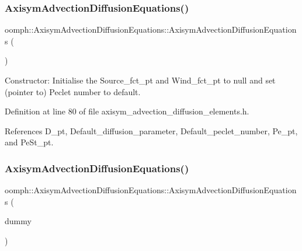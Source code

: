 \subsubsection{\texorpdfstring{Axisym\+Advection\+Diffusion\+Equations()}{AxisymAdvectionDiffusionEquations()}\hspace{0.1cm}{\footnotesize\ttfamily [1/2]}}
{\footnotesize\ttfamily oomph\+::\+Axisym\+Advection\+Diffusion\+Equations\+::\+Axisym\+Advection\+Diffusion\+Equations (\begin{DoxyParamCaption}{ }\end{DoxyParamCaption})\hspace{0.3cm}{\ttfamily [inline]}}



Constructor\+: Initialise the Source\+\_\+fct\+\_\+pt and Wind\+\_\+fct\+\_\+pt to null and set (pointer to) Peclet number to default. 



Definition at line 80 of file axisym\+\_\+advection\+\_\+diffusion\+\_\+elements.\+h.



References D\+\_\+pt, Default\+\_\+diffusion\+\_\+parameter, Default\+\_\+peclet\+\_\+number, Pe\+\_\+pt, and Pe\+St\+\_\+pt.

\mbox{\label{classoomph_1_1AxisymAdvectionDiffusionEquations_a6932ab2bbb743d14a97d26fd9f0000d4}} 
\subsubsection{\texorpdfstring{Axisym\+Advection\+Diffusion\+Equations()}{AxisymAdvectionDiffusionEquations()}\hspace{0.1cm}{\footnotesize\ttfamily [2/2]}}
{\footnotesize\ttfamily oomph\+::\+Axisym\+Advection\+Diffusion\+Equations\+::\+Axisym\+Advection\+Diffusion\+Equations (\begin{DoxyParamCaption}\item[{const \hyperlink{classoomph_1_1AxisymAdvectionDiffusionEquations}{Axisym\+Advection\+Diffusion\+Equations} \&}]{dummy }\end{DoxyParamCaption})\hspace{0.3cm}{\ttfamily [inline]}}



